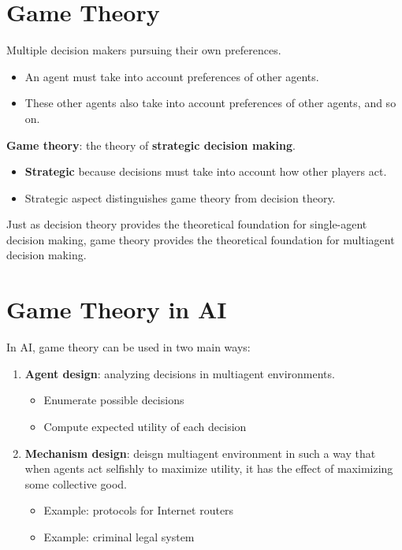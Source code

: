 \documentclass[11pt]{article}
\begin{document}
\section{Game Theory}
\label{sec:org22b3c89}

Multiple decision makers pursuing their own preferences.

\begin{itemize}
\item An agent must take into account preferences of other agents.
\item These other agents also take into account preferences of other agents, and so on.
\end{itemize}

\textbf{Game theory}: the theory of \textbf{strategic decision making}.

\begin{itemize}
\item \textbf{Strategic} because decisions must take into account how other players act.
\item Strategic aspect distinguishes game theory from decision theory.
\end{itemize}

Just as decision theory provides the theoretical foundation for single-agent decision making, game theory provides the theoretical foundation for multiagent decision making.
\section{Game Theory in AI}
\label{sec:orgcd38651}

In AI, game theory can be used in two main ways:

\begin{enumerate}
\item \textbf{Agent design}: analyzing decisions in multiagent environments.

\begin{itemize}
\item Enumerate possible decisions
\item Compute expected utility of each decision
\end{itemize}

\item \textbf{Mechanism design}: deisgn multiagent environment in such a way that when agents act selfishly to maximize utility, it has the effect of maximizing some collective good.

\begin{itemize}
\item Example: protocols for Internet routers
\item Example: criminal legal system
\end{itemize}
\end{enumerate}
\end{document}
